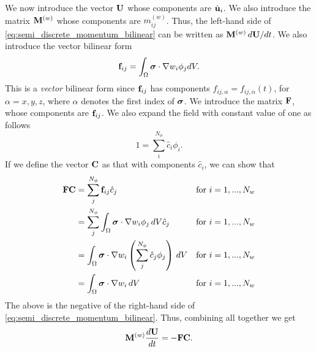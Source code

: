 \documentclass[11pt]{article}
\begin{document}
We now introduce the vector $\mathbf{U}$ whose components are $\hat{\mathbf{u}}_i$. We also introduce the matrix $\mathbf{M}^{(w)}$ whose components are $m_{ij}^{(w)}$. Thus, the left-hand side of \cref{eq:semi_discrete_momentum_bilinear} can be written as $\mathbf{M}^{(w)} \, d\mathbf{U} / dt$.
We also introduce the vector bilinear form
\begin{equation}
    \mathbf{f}_{ij} = \int_\Omega \bm \sigma \cdot \nabla w_i \phi_j dV.
\end{equation}
This is a \textit{vector} bilinear form since $\mathbf{f}_{ij}$ has components $f_{ij,\alpha} = f_{ij,\alpha}(t)$, for $\alpha = x,y,z$, where $\alpha$ denotes the first index of $\bm \sigma$. We introduce the matrix $\mathbf{F}$, whose components are $\mathbf{f}_{ij}$. We also expand the field with constant value of one as follows
\begin{equation}
    1 = \sum_i^{N_\phi} \hat{c}_i \phi_i.
\end{equation}
If we define the vector $\mathbf{C}$ as that with components $\hat{c}_i$, we can show that 
\begin{align}
    \mathbf{F} \mathbf{C} &= \sum_j^{N_\phi} \mathbf{f}_{ij} \hat{c}_j &\text{for } i = 1,...,N_w \nonumber \\
    &= \sum_j^{N_\phi} \int_\Omega \bm \sigma \cdot \nabla w_i \phi_j \, dV \hat{c}_j &\text{for } i = 1,...,N_w \nonumber \\
    &= \int_\Omega \bm \sigma \cdot \nabla w_i \left ( \sum_j^{N_\phi} \hat{c}_j \phi_j \right ) \, dV &\text{for } i = 1,...,N_w \nonumber \\
    &= \int_\Omega \bm \sigma \cdot \nabla w_i \, dV &\text{for } i = 1,...,N_w
\end{align}
The above is the negative of the right-hand side of \cref{eq:semi_discrete_momentum_bilinear}. Thus, combining all together we get
\begin{equation}
    \mathbf{M}^{(w)} \frac{d\mathbf{U}}{dt} = -\mathbf{F} \mathbf{C}.
\end{equation}
\end{document}
